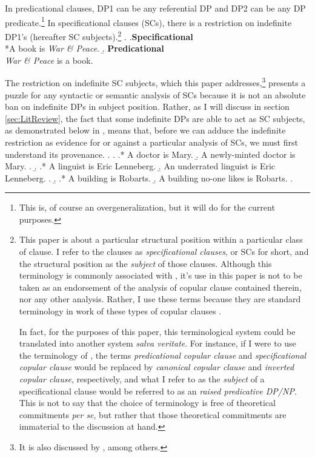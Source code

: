 \documentclass[letterpaper]{article}
\begin{document}
In predicational clauses, DP1 can be any referential DP and DP2 can be any DP predicate.\footnote{This is, of course an overgeneralization, but it will do for the current purposes.}
In specificational clauses (SCs), there is a restriction on indefinite DP1's (hereafter SC subjects).\footnote{
	This paper is about a particular structural position within a particular class of clause.
	I refer to the clauses as \textit{specificational clauses}, or SCs for short, and the structural position as the \textit{subject} of those clauses.
	Although this terminology is commonly associated with \textcite{higgins1973pseudo}, it's use in this paper is not to be taken as an endorsement of the analysis of copular clause contained therein, nor any other analysis.
	Rather, I use these terms because they are standard terminology in work of these types of copular clauses \parencite[see, for instance,][]{heycock2012specification,bejarkahnemuyipour2013agreement,mikkelsen2005copular}.

	In fact, for the purposes of this paper, this terminological system could be translated into another system \textit{salva veritate}.
	For instance, if I were to use the terminology of \textcite{moro1997raising}, the terms \textit{predicational copular clause} and \textit{specificational copular clause} would be replaced by \textit{canonical copular clause} and \textit{inverted copular clause}, respectively, and what I refer to as the \textit{subject} of a specificational clause would be referred to as an \textit{raised predicative DP/NP}. 
	This is not to say that the choice of terminology is free of theoretical commitments \textit{per se}, but rather that those theoretical commitments are immaterial to the discussion at hand.
}
\ex.\label{ex:TheData}
\a.\textbf{Specificational}\\
*A book is \textit{War \& Peace}.
\b. \textbf{Predicational}\\
\textit{War \& Peace} is a book.

The restriction on indefinite SC subjects, which this paper addresses,\footnote{
	It is also discussed by \textcite{mikkelsen2005copular,halliday1967notes,higgins1973pseudo,heggie1988diss,heycock1994internal,williams1997asymmetry}, among others.
} presents a puzzle for any syntactic or semantic analysis of SCs because it is not an absolute ban on indefinite DPs in subject position.
Rather, as I will discuss in section \ref{sec:LitReview}, the fact that some indefinite DPs are able to act as SC subjects, as demonstrated below in \Next, means that, before we can adduce the indefinite restriction as evidence for or against a particular analysis of SCs, we must first understand its provenance.
\ex.\label{ex:TheData} 
\a.
\a.* A doctor is Mary.
\b. A newly-minted doctor is Mary.
\z.
\b.
\a.* A linguist is Eric Lenneberg.
\b. An underrated linguist is Eric Lenneberg.
\z.
\b.
\a.* A building is Robarts.
\b. A building no-one likes is Robarts.
\z.
\end{document}
